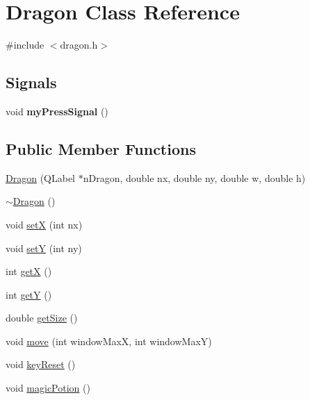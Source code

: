 \hypertarget{classDragon}{\section{\-Dragon \-Class \-Reference}
\label{classDragon}
}


{\ttfamily \#include $<$dragon.\-h$>$}

\subsection*{\-Signals}
\begin{DoxyCompactItemize}
\item 
\hypertarget{classDragon_a3671c185209a680de8f7fd75fdff02cb}{void {\bfseries my\-Press\-Signal} ()}\label{classDragon_a3671c185209a680de8f7fd75fdff02cb}

\end{DoxyCompactItemize}
\subsection*{\-Public \-Member \-Functions}
\begin{DoxyCompactItemize}
\item 
\hyperlink{classDragon_a90a16818942945b821127173aedeeffa}{\-Dragon} (\-Q\-Label $\ast$n\-Dragon, double nx, double ny, double w, double h)
\item 
\hyperlink{classDragon_ae34521402d155aae936b65afbee22cf5}{$\sim$\-Dragon} ()
\item 
void \hyperlink{classDragon_a3aa3319b385228dab7840f5a8d22d1ec}{set\-X} (int nx)
\item 
void \hyperlink{classDragon_ac0093bcb3ff6ada080ae555bdc2339e4}{set\-Y} (int ny)
\item 
int \hyperlink{classDragon_a65e27a25444f3cf41c398f966c98600c}{get\-X} ()
\item 
int \hyperlink{classDragon_a7813dbdf80360c341aadf912e966c7c4}{get\-Y} ()
\item 
double \hyperlink{classDragon_ac873a3aaa09f50699c0705a720e89a09}{get\-Size} ()
\item 
void \hyperlink{classDragon_a3127fa55e4cc115ecd008655a7c07471}{move} (int window\-Max\-X, int window\-Max\-Y)
\item 
void \hyperlink{classDragon_a7a65aca84bed48dee9ecd1808851e7b2}{key\-Reset} ()
\item 
void \hyperlink{classDragon_ae2aa4a9df7918b277fff80398f84486a}{magic\-Potion} ()
\end{DoxyCompactItemize}
